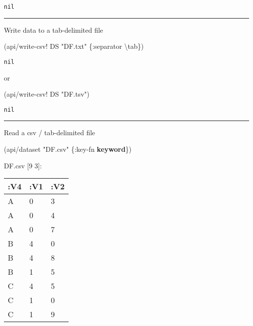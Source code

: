 \documentclass[]{article}
\newenvironment{Shaded}{\begin{snugshade}}{\end{snugshade}}
\newcommand{\KeywordTok}[1]{\textcolor[rgb]{0.13,0.29,0.53}{\textbf{#1}}}
\newcommand{\CharTok}[1]{\textcolor[rgb]{0.31,0.60,0.02}{#1}}
\newcommand{\StringTok}[1]{\textcolor[rgb]{0.31,0.60,0.02}{#1}}
\newcommand{\AttributeTok}[1]{\textcolor[rgb]{0.77,0.63,0.00}{#1}}
\newcommand{\NormalTok}[1]{#1}
\begin{document}
\begin{verbatim}
nil
\end{verbatim}

\begin{center}\rule{0.5\linewidth}{0.5pt}\end{center}

Write data to a tab-delimited file

\begin{Shaded}
\begin{Highlighting}[]
\NormalTok{(api/write-csv! DS }\StringTok{"DF.txt"}\NormalTok{ \{}\AttributeTok{:separator} \CharTok{\textbackslash{}tab}\NormalTok{\})}
\end{Highlighting}
\end{Shaded}

\begin{verbatim}
nil
\end{verbatim}

or

\begin{Shaded}
\begin{Highlighting}[]
\NormalTok{(api/write-csv! DS }\StringTok{"DF.tsv"}\NormalTok{)}
\end{Highlighting}
\end{Shaded}

\begin{verbatim}
nil
\end{verbatim}

\begin{center}\rule{0.5\linewidth}{0.5pt}\end{center}

Read a csv / tab-delimited file

\begin{Shaded}
\begin{Highlighting}[]
\NormalTok{(api/dataset }\StringTok{"DF.csv"}\NormalTok{ \{}\AttributeTok{:key-fn} \KeywordTok{keyword}\NormalTok{\})}
\end{Highlighting}
\end{Shaded}

DF.csv {[}9 3{]}:

\begin{longtable}[]{@{}lll@{}}
\toprule
:V4 & :V1 & :V2\tabularnewline
\midrule
\endhead
A & 0 & 3\tabularnewline
A & 0 & 4\tabularnewline
A & 0 & 7\tabularnewline
B & 4 & 0\tabularnewline
B & 4 & 8\tabularnewline
B & 1 & 5\tabularnewline
C & 4 & 5\tabularnewline
C & 1 & 0\tabularnewline
C & 1 & 9\tabularnewline
\bottomrule
\end{longtable}
\end{document}
